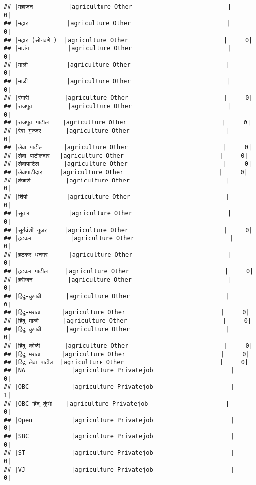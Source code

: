 \documentclass[
]{article}
\begin{document}
\begin{verbatim}
## |महाजन          |agriculture Other                           |     0|
## |महार           |agriculture Other                           |     0|
## |महार (सोनवणे )  |agriculture Other                           |     0|
## |मातंग           |agriculture Other                           |     0|
## |माली           |agriculture Other                           |     0|
## |माळी           |agriculture Other                           |     0|
## |रंगारी          |agriculture Other                           |     0|
## |राजपूत          |agriculture Other                           |     0|
## |राजपूत पाटील    |agriculture Other                           |     0|
## |रेवा गुज्जर       |agriculture Other                           |     0|
## |लेवा पाटील      |agriculture Other                           |     0|
## |लेवा पाटीलदार   |agriculture Other                           |     0|
## |लेवापाटिल       |agriculture Other                           |     0|
## |लेवापाटीदार     |agriculture Other                           |     0|
## |वंजारी          |agriculture Other                           |     0|
## |शिंपी           |agriculture Other                           |     0|
## |सुतार           |agriculture Other                           |     0|
## |सूर्यवंशी गुजर     |agriculture Other                           |     0|
## |हटकर           |agriculture Other                           |     0|
## |हटकर धनगर      |agriculture Other                           |     0|
## |हटकर पाटील     |agriculture Other                           |     0|
## |हरीजन          |agriculture Other                           |     0|
## |हिंदू-कुणबी       |agriculture Other                           |     0|
## |हिंदू-मराठा      |agriculture Other                           |     0|
## |हिंदू-माळी       |agriculture Other                           |     0|
## |हिंदू कुणबी       |agriculture Other                           |     0|
## |हिंदू कोळी       |agriculture Other                           |     0|
## |हिंदू मराठा      |agriculture Other                           |     0|
## |हिंदू लेवा पाटील  |agriculture Other                           |     0|
## |NA             |agriculture Privatejob                      |     0|
## |OBC            |agriculture Privatejob                      |     1|
## |OBC हिंदू कुंभी    |agriculture Privatejob                      |     0|
## |Open           |agriculture Privatejob                      |     0|
## |SBC            |agriculture Privatejob                      |     0|
## |ST             |agriculture Privatejob                      |     0|
## |VJ             |agriculture Privatejob                      |     0|

\end{verbatim}
\end{document}
